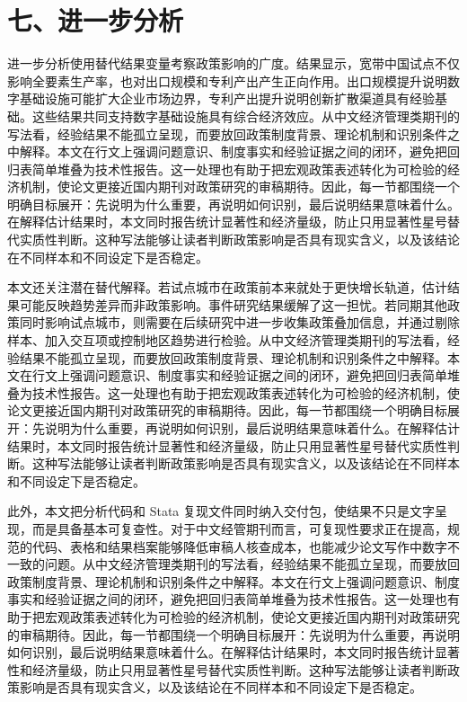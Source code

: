 \documentclass[12pt,a4paper]{article}
\begin{document}
\section*{七、进一步分析}
进一步分析使用替代结果变量考察政策影响的广度。结果显示，宽带中国试点不仅影响全要素生产率，也对出口规模和专利产出产生正向作用。出口规模提升说明数字基础设施可能扩大企业市场边界，专利产出提升说明创新扩散渠道具有经验基础。这些结果共同支持数字基础设施具有综合经济效应。从中文经济管理类期刊的写法看，经验结果不能孤立呈现，而要放回政策制度背景、理论机制和识别条件之中解释。本文在行文上强调问题意识、制度事实和经验证据之间的闭环，避免把回归表简单堆叠为技术性报告。这一处理也有助于把宏观政策表述转化为可检验的经济机制，使论文更接近国内期刊对政策研究的审稿期待。因此，每一节都围绕一个明确目标展开：先说明为什么重要，再说明如何识别，最后说明结果意味着什么。在解释估计结果时，本文同时报告统计显著性和经济量级，防止只用显著性星号替代实质性判断。这种写法能够让读者判断政策影响是否具有现实含义，以及该结论在不同样本和不同设定下是否稳定。

本文还关注潜在替代解释。若试点城市在政策前本来就处于更快增长轨道，估计结果可能反映趋势差异而非政策影响。事件研究结果缓解了这一担忧。若同期其他政策同时影响试点城市，则需要在后续研究中进一步收集政策叠加信息，并通过剔除样本、加入交互项或控制地区趋势进行检验。从中文经济管理类期刊的写法看，经验结果不能孤立呈现，而要放回政策制度背景、理论机制和识别条件之中解释。本文在行文上强调问题意识、制度事实和经验证据之间的闭环，避免把回归表简单堆叠为技术性报告。这一处理也有助于把宏观政策表述转化为可检验的经济机制，使论文更接近国内期刊对政策研究的审稿期待。因此，每一节都围绕一个明确目标展开：先说明为什么重要，再说明如何识别，最后说明结果意味着什么。在解释估计结果时，本文同时报告统计显著性和经济量级，防止只用显著性星号替代实质性判断。这种写法能够让读者判断政策影响是否具有现实含义，以及该结论在不同样本和不同设定下是否稳定。

此外，本文把分析代码和 Stata 复现文件同时纳入交付包，使结果不只是文字呈现，而是具备基本可复查性。对于中文经管期刊而言，可复现性要求正在提高，规范的代码、表格和结果档案能够降低审稿人核查成本，也能减少论文写作中数字不一致的问题。从中文经济管理类期刊的写法看，经验结果不能孤立呈现，而要放回政策制度背景、理论机制和识别条件之中解释。本文在行文上强调问题意识、制度事实和经验证据之间的闭环，避免把回归表简单堆叠为技术性报告。这一处理也有助于把宏观政策表述转化为可检验的经济机制，使论文更接近国内期刊对政策研究的审稿期待。因此，每一节都围绕一个明确目标展开：先说明为什么重要，再说明如何识别，最后说明结果意味着什么。在解释估计结果时，本文同时报告统计显著性和经济量级，防止只用显著性星号替代实质性判断。这种写法能够让读者判断政策影响是否具有现实含义，以及该结论在不同样本和不同设定下是否稳定。
\end{document}

